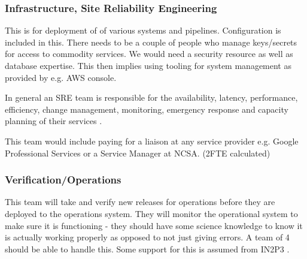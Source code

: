 \subsubsection{Infrastructure, Site Reliability Engineering  } \label{ses:infra}
This is for deployment of of various systems and pipelines. Configuration is included in this. There needs to be a couple of people who manage keys/secrets
for access to commodity services. We would need a security resource as well as database expertise.  This then implies using tooling for system management as
provided by e.g. \gls{AWS} console.

In general an \gls{SRE} team is responsible for the availability, latency, performance, efficiency, change management, monitoring, emergency response and capacity planning of their services \cite{Beyer:2016:SRE:3006357}.

This team would include paying for a liaison at any service provider e.g. Google Professional Services or a Service Manager at \gls{NCSA}. (2FTE calculated)

\subsubsection{Verification/Operations }
This team will take and verify new releases for operations before they are deployed to the operations system. They will monitor the operational system to make sure it is functioning - they should have some science knowledge to know it is actually working properly as opposed to not just giving errors. A team of 4 should be able to handle this.
Some support for this is assumed from IN2P3 .
